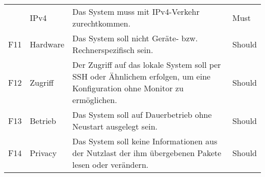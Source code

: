 \documentclass[../review_1.tex]{subfiles}
\begin{document}
\begin{longtable} [h] {p{1cm} p{4cm} p{7cm} l}
     & IPv4                                           & Das System muss mit IPv4-Verkehr zurechtkommen.                                                                                                                                                                                                         & Must            \\
    F11                                                                                                                                                                                                                                                                                            & Hardware                                       & Das System soll nicht Geräte- bzw. Rechnerspezifisch sein.                                                                                                                                                                                              & Should          \\
    F12                                                                                                                                                                                                              & Zugriff                                        & Der Zugriff auf das lokale System soll per SSH oder Ähnlichem erfolgen, um eine Konfiguration ohne Monitor zu ermöglichen.                                                                                                                              & Should          \\
    F13                                                                                                                                                                                                              & Betrieb                                        & Das System soll auf Dauerbetrieb ohne Neustart ausgelegt sein.                                                                                                                                                                                          & Should          \\
    F14                                                                                                                                                                                                              & Privacy                                        & Das System soll keine Informationen aus der Nutzlast der ihm übergebenen Pakete lesen oder verändern.                                                                                                                                                   & Should          \\

\end{longtable}
\end{document}
